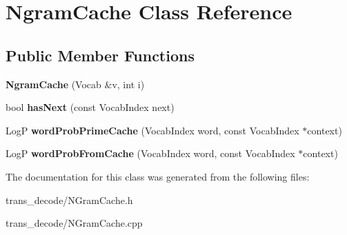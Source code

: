 \hypertarget{classNgramCache}{
\section{NgramCache Class Reference}
\label{classNgramCache}
}
\subsection*{Public Member Functions}
\begin{DoxyCompactItemize}
\item 
\hypertarget{classNgramCache_a1d8b66016081c1e0d15b2199e48c4df9}{
{\bfseries NgramCache} (Vocab \&v, int i)}
\label{classNgramCache_a1d8b66016081c1e0d15b2199e48c4df9}

\item 
\hypertarget{classNgramCache_aaf831fb4e48aa1a8f8d46287adb7c419}{
bool {\bfseries hasNext} (const VocabIndex next)}
\label{classNgramCache_aaf831fb4e48aa1a8f8d46287adb7c419}

\item 
\hypertarget{classNgramCache_a3444ab6a1b5a140edb089efb51b071c1}{
LogP {\bfseries wordProbPrimeCache} (VocabIndex word, const VocabIndex $\ast$context)}
\label{classNgramCache_a3444ab6a1b5a140edb089efb51b071c1}

\item 
\hypertarget{classNgramCache_a7806b0a2832644fcde66aa928a58caa9}{
LogP {\bfseries wordProbFromCache} (VocabIndex word, const VocabIndex $\ast$context)}
\label{classNgramCache_a7806b0a2832644fcde66aa928a58caa9}

\end{DoxyCompactItemize}


The documentation for this class was generated from the following files:\begin{DoxyCompactItemize}
\item 
trans\_\-decode/NGramCache.h\item 
trans\_\-decode/NGramCache.cpp\end{DoxyCompactItemize}

